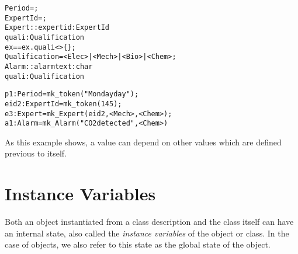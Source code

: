 \documentclass[\pformat,12pt]{article}
\begin{document}
\begin{description}
\begin{alltt}
     Period = ;
     ExpertId = ;
     Expert :: expertid : ExpertId
               quali :  Qualification
      ex == ex.quali <> \{\};
     Qualification = <Elec> | <Mech> | <Bio> | <Chem>;
     Alarm :: alarmtext :  char
              quali : Qualification

 
     \PUBLIC p1: Period = mk_token("Monday day");
     \PRIVATE eid2 : ExpertId = mk_token(145);
     \PROTECTED e3 : Expert = mk_Expert(eid2, { <Mech>, <Chem> });
     \mbox{} a1 : Alarm = mk_Alarm("CO2 detected", <Chem>)
\end{alltt}
  As this example shows, a value can depend on other values which are
  defined previous to itself.
\end{description}

\section{Instance Variables}
\label{sec:ivars}

Both an object instantiated from a class description and the class
itself can have an internal state, also called the \emph{instance
  variables} of the object or class. In the case of objects, we also
refer to this state as the global state of the object.
\end{document}
